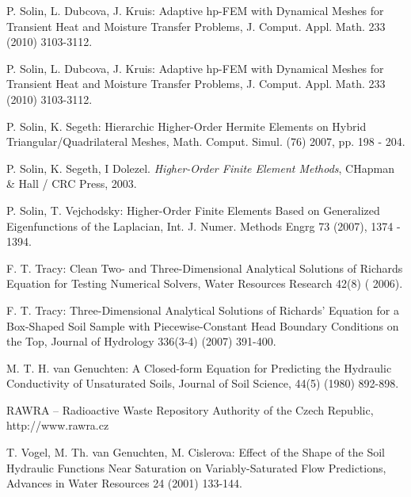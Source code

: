 \documentclass[final,3p,times,twocolumn]{elsarticle}
\begin{document}
\begin{thebibliography}{00}
    P. Solin, L. Dubcova, J. Kruis: Adaptive hp-FEM with Dynamical Meshes for Transient Heat and Moisture Transfer Problems, J. Comput. Appl. Math. 233 (2010) 3103-3112.

    P. Solin, L. Dubcova, J. Kruis: Adaptive hp-FEM with Dynamical Meshes for Transient Heat and Moisture Transfer Problems, J. Comput. Appl. Math. 233 (2010) 3103-3112.

    P. Solin, K. Segeth: Hierarchic Higher-Order Hermite Elements on Hybrid
    Triangular/Quadrilateral Meshes, Math. Comput. Simul. (76) 2007, pp. 198 - 204.

    P. Solin, K. Segeth, I Dolezel. {\em Higher-Order Finite Element Methods}, CHapman \& Hall / CRC Press,
    2003.

    P. Solin, T. Vejchodsky: Higher-Order Finite Elements Based on Generalized Eigenfunctions
    of the Laplacian, Int. J. Numer. Methods Engrg 73 (2007), 1374 - 1394.


     F. T. Tracy: Clean Two- and Three-Dimensional Analytical Solutions of Richards Equation for Testing 
    Numerical Solvers, Water Resources Research 42(8) ( 2006).

 F. T. Tracy: Three-Dimensional Analytical Solutions of Richards’ Equation for a Box-Shaped Soil 
    Sample with Piecewise-Constant Head Boundary Conditions on the Top, Journal of Hydrology 336(3-4) (2007) 391-400.


    M. T. H. van Genuchten: A Closed-form Equation for Predicting the Hydraulic Conductivity of Unsaturated Soils, Journal of Soil Science, 44(5) (1980) 892-898.

 RAWRA -- Radioactive Waste Repository Authority of the Czech Republic, http://www.rawra.cz

 T. Vogel, M. Th. van Genuchten, M. Cislerova: Effect of the Shape of the Soil Hydraulic Functions Near Saturation on
Variably-Saturated Flow Predictions, Advances in Water Resources 24 (2001) 133-144.


 \end{thebibliography}
\end{document}
